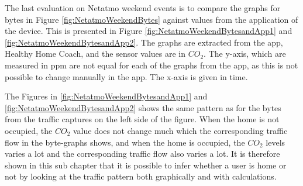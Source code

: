 The last evaluation on Netatmo weekend events is to compare the graphs for bytes in Figure \ref{fig:NetatmoWeekendBytes} against values from the application of the device. This is presented in Figure \ref{fig:NetatmoWeekendBytesandApp1} and \ref{fig:NetatmoWeekendBytesandApp2}. The graphs are extracted from the app, Healthy Home Coach, and the sensor values are in \(CO_2\). The y-axis, which are measured in ppm are not equal for each of the graphs from the app, as this is not possible to change manually in the app. The x-axis is given in time. 

The Figures in \ref{fig:NetatmoWeekendBytesandApp1} and \ref{fig:NetatmoWeekendBytesandApp2} shows the same pattern as for the bytes from the traffic captures on the left side of the figure. When the home is not occupied, the \(CO_2\) value does not change much which the corresponding traffic flow in the byte-graphs shows, and when the home is occupied, the \(CO_2\) levels varies a lot and the corresponding traffic flow also varies a lot. It is therefore shown in this sub chapter that it is possible to infer whether a user is home or not by looking at the traffic pattern both graphically and with calculations. 

